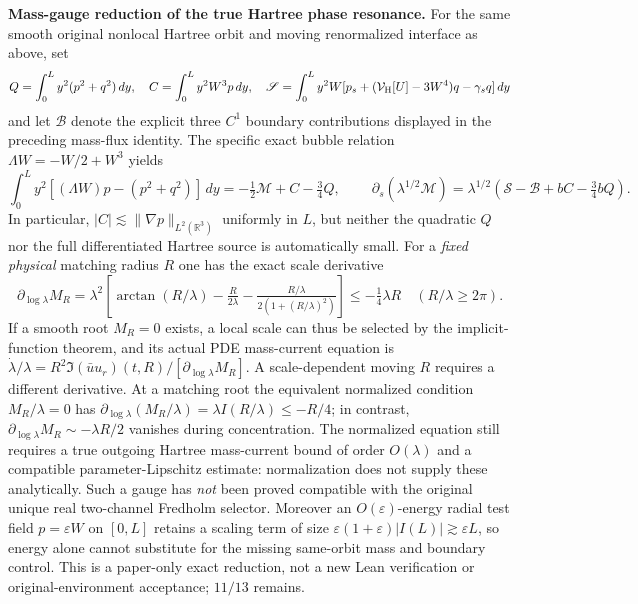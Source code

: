 \documentclass[11pt]{amsart}
\newcommand{\R}{\mathbb R}
\begin{document}
\medskip
\noindent\textbf{Mass-gauge reduction of the true Hartree phase resonance.}
For the same smooth original nonlocal Hartree orbit and moving
renormalized interface as above, set
\[
 Q=\int_0^L y^2(p^2+q^2)\,dy,\quad
 C=\int_0^L y^2W^3p\,dy,\quad
 \mathscr S=\int_0^L y^2W
 [p_s+(\mathcal V_{\rm H}[U]-3W^4)q-\gamma_sq]\,dy
\]
and let $\mathscr B$ denote the explicit three $C^1$ boundary
contributions displayed in the preceding mass-flux identity.
The specific exact bubble relation $\Lambda W=-W/2+W^3$ yields
\[
 \int_0^L y^2[(\Lambda W)p-(p^2+q^2)]\,dy
   =-\tfrac12\mathscr M+C-\tfrac34 Q,
 \qquad
 \boxed{\ 
 \partial_s(\lambda^{1/2}\mathscr M)
  =\lambda^{1/2}(\mathscr S-\mathscr B+bC-\tfrac34 bQ).
 \ }
\]
In particular, $|C|\lesssim\|\nabla p\|_{L^2(\R^3)}$
uniformly in $L$, but neither the quadratic $Q$ nor the
full differentiated Hartree source is automatically small.
For a \emph{fixed physical} matching radius $R$ one has the
exact scale derivative
\[
 \partial_{\log\lambda}M_R
  =\lambda^2\left[
    \arctan(R/\lambda)-\tfrac{R}{2\lambda}
      -\tfrac{R/\lambda}{2(1+(R/\lambda)^2)}\right]
  \le-\tfrac14\lambda R
  \quad (R/\lambda\ge2\pi).
\]
If a smooth root $M_R=0$ exists, a local scale can thus
be selected by the implicit-function theorem, and its
actual PDE mass-current equation is
$\dot\lambda/\lambda=R^2\Im(\bar u u_r)(t,R)/
[\partial_{\log\lambda}M_R]$.
A scale-dependent moving $R$ requires a different derivative.
At a matching root the equivalent normalized condition
$M_R/\lambda=0$ has
$\partial_{\log\lambda}(M_R/\lambda)=
\lambda I(R/\lambda)\le-R/4$; in contrast,
$\partial_{\log\lambda}M_R\sim-\lambda R/2$
vanishes during concentration. The normalized equation still
requires a true outgoing Hartree mass-current bound of order
$O(\lambda)$ and a compatible parameter-Lipschitz estimate:
normalization does not supply these analytically.
Such a gauge has \emph{not} been proved compatible with the
original unique real two-channel Fredholm selector.
Moreover an $O(\varepsilon)$-energy radial test field
$p=\varepsilon W$ on $[0,L]$ retains a scaling term of
size $\varepsilon(1+\varepsilon)|I(L)|\gtrsim\varepsilon L$,
so energy alone cannot substitute for the missing
same-orbit mass and boundary control.
This is a paper-only exact reduction, not a new Lean
verification or original-environment acceptance; $11/13$ remains.
\end{document}
